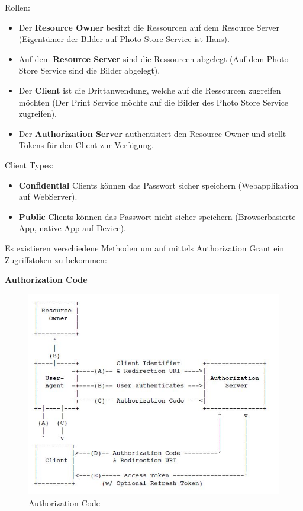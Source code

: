 Rollen:
\begin{itemize}
	\item Der \textbf{Resource Owner} besitzt die Ressourcen auf dem Resource Server (Eigentümer der Bilder auf Photo Store Service ist Hans).
	
	\item Auf dem \textbf{Resource Server} sind die Ressourcen abgelegt (Auf dem Photo Store Service sind die Bilder abgelegt).
	
	\item Der \textbf{Client} ist die Drittanwendung, welche auf die Ressourcen zugreifen möchten (Der Print Service möchte auf die Bilder des Photo Store Service zugreifen).
	
	\item Der \textbf{Authorization Server} authentisiert den Resource Owner und stellt Tokens für den Client zur Verfügung.
\end{itemize}

Client Types:
\begin{itemize}
	\item \textbf{Confidential} Clients können das Passwort sicher speichern (Webapplikation auf WebServer).
	
	\item \textbf{Public} Clients können das Passwort nicht sicher speichern (Browserbasierte App, native App auf Device).
\end{itemize}

Es existieren verschiedene Methoden um auf mittels Authorization Grant ein Zugriffstoken zu bekommen:

\textbf{Authorization Code}
\begin{figure}[h!]
\centering
\includegraphics[width=0.7\linewidth]{fig/authorization-code}
\caption{Authorization Code}
\label{fig:authorization-code}
\end{figure}

